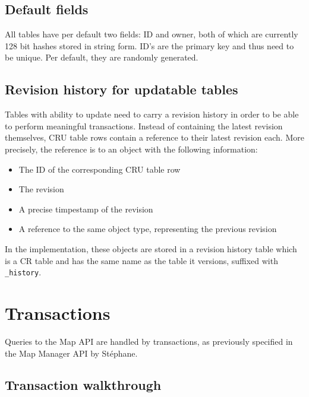 \documentclass{article}
\begin{document}
\subsection{Default fields}

All tables have per default two fields: ID and owner, both of which are
currently 128 bit hashes stored in string form. ID's are the primary key and
thus need to be unique. Per default, they are randomly generated.

\subsection{Revision history for updatable tables}

Tables with ability to update need to carry a revision history in order to be
able to perform meaningful transactions.
Instead of containing the latest revision themselves, CRU table rows contain
a reference to their latest revision each. More precisely, the reference is to
an object with the following information:

\begin{itemize} \itemsep0em
  \item The ID of the corresponding CRU table row
  \item The revision
  \item A precise timpestamp of the revision
  \item A reference to the same object type, representing the previous revision
\end{itemize}

In the implementation, these objects are stored in a revision history table
which is a CR table and has the same name as the table it versions, suffixed
with {\tt \_history}.

\section{Transactions}\label{transactions}

Queries to the Map API are handled by transactions, as previously specified in
the Map Manager API by Stéphane.

\subsection{Transaction walkthrough}
\end{document}
